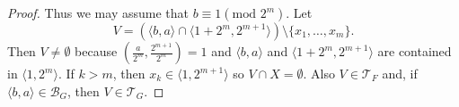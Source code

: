 \documentclass{amsart}
\theoremstyle{definition}
\newcommand{\I}{\mathcal I}
\newcommand{\T}{\mathcal{T}}
\newcommand{\B}{\mathcal{B}}
\newcommand{\modulo}{\textrm{mod }}
\newcommand{\arithseq}[2]{\langle#2, #1\rangle}
\begin{document}
\begin{proof}
  Thus we may assume that $b\equiv 1(\modulo 2^m)$. Let 
\[
V = (\arithseq{a}{b} \cap \arithseq{2^{m+1}}{1 + 2^m}) \setminus \{x_1,\ldots, x_{m}\}.
\]
Then $V \not= \emptyset$ because $(\frac{a}{2^m} , \frac{2^{m+1}}{2^m}) = 1$
and $\arithseq{a}{b}$ and $\arithseq{2^{m+1}}{1 + 2^m}$
are contained in $\arithseq{2^m}{1}$. 
If $k > m$, then $x_k \in \arithseq{2^{m+1}}{1}$ so 
$V\cap X = \emptyset$. Also $V\in\T_F$ and, if $\arithseq{a}{b} \in \B_G$, then
$V \in \T_G$.


\end{proof}
\end{document}
